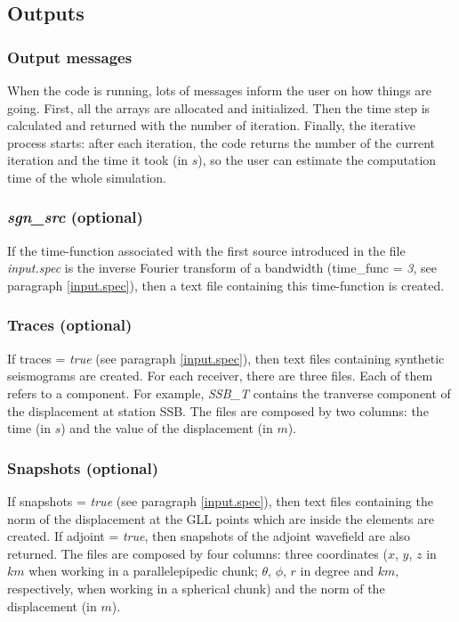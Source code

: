 \subsection{Outputs}


\subsubsection{Output messages}
\label{print_output}

When the code is running, lots of messages inform the user on how things are going. First, all the arrays are
allocated and initialized. Then the time step is calculated and returned with the number of iteration.
Finally, the iterative process starts: after each iteration, the code returns the number of the current
iteration and the time it took (in $s$), so the user can estimate the computation time of the whole
simulation.


\subsubsection{\textit{sgn\_src} (optional)}

If the time-function associated with the first source introduced in the file \textit{input.spec} is the
inverse Fourier transform of a bandwidth (time\_func = \textit{3}, see paragraph \ref{input.spec}), then a
text file containing this time-function is created.


\subsubsection{Traces (optional)}
\label{outputtraces}

If traces = \textit{true} (see paragraph \ref{input.spec}), then text files containing synthetic seismograms
are created. For each receiver, there are three files. Each of them refers to a component. For example,
\textit{SSB\_T} contains the tranverse component of the displacement at station SSB. The files are composed by
two columns: the time (in $s$) and the value of the displacement (in $m$).


\subsubsection{Snapshots (optional)}
\label{outputshots}

If snapshots = \textit{true} (see paragraph \ref{input.spec}), then text files containing the norm of the
displacement at the GLL points which are inside the elements are created. If adjoint = \textit{true}, then
snapshots of the adjoint wavefield are also returned. The files are composed by four columns: three coordinates
($x$, $y$, $z$ in $km$ when working in a parallelepipedic chunk; $\theta$, $\phi$, $r$ in degree and $km$,
respectively, when working in a spherical chunk) and the norm of the displacement (in $m$).



